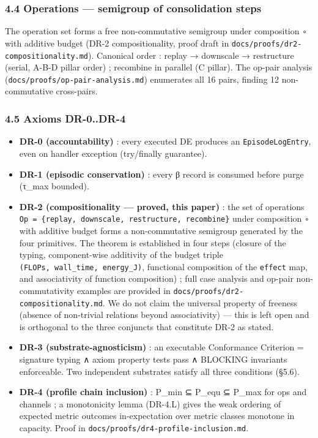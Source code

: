 \documentclass[
]{article}
\providecommand{\tightlist}{%
  \setlength{\itemsep}{0pt}\setlength{\parskip}{0pt}}
\begin{document}
\subsubsection{4.4 Operations --- semigroup of consolidation
steps}\label{operations-semigroup-of-consolidation-steps}

The operation set forms a free non-commutative semigroup under
composition \texttt{∘} with additive budget (DR-2 compositionality,
proof draft in \texttt{docs/proofs/dr2-compositionality.md}). Canonical
order : replay → downscale → restructure (serial, A-B-D pillar order) ;
recombine in parallel (C pillar). The op-pair analysis
(\texttt{docs/proofs/op-pair-analysis.md}) enumerates all 16 pairs,
finding 12 non-commutative cross-pairs.

\subsubsection{4.5 Axioms DR-0..DR-4}\label{axioms-dr-0..dr-4}

\begin{itemize}
\tightlist
\item
  \textbf{DR-0 (accountability)} : every executed DE produces an
  \texttt{EpisodeLogEntry}, even on handler exception (try/finally
  guarantee).
\item
  \textbf{DR-1 (episodic conservation)} : every β record is consumed
  before purge (τ\_max bounded).
\item
  \textbf{DR-2 (compositionality --- proved, this paper)} : the set of
  operations
  \texttt{Op\ =\ \{replay,\ downscale,\ restructure,\ recombine\}} under
  composition \texttt{∘} with additive budget forms a non-commutative
  semigroup generated by the four primitives. The theorem is established
  in four steps (closure of the typing, component-wise additivity of the
  budget triple \texttt{(FLOPs,\ wall\_time,\ energy\_J)}, functional
  composition of the \texttt{effect} map, and associativity of function
  composition) ; full case analysis and op-pair non-commutativity
  examples are provided in \texttt{docs/proofs/dr2-compositionality.md}.
  We do not claim the universal property of freeness (absence of
  non-trivial relations beyond associativity) --- this is left open and
  is orthogonal to the three conjuncts that constitute DR-2 as stated.
\item
  \textbf{DR-3 (substrate-agnosticism)} : an executable Conformance
  Criterion = signature typing ∧ axiom property tests pass ∧ BLOCKING
  invariants enforceable. Two independent substrates satisfy all three
  conditions (§5.6).
\item
  \textbf{DR-4 (profile chain inclusion)} : P\_min ⊆ P\_equ ⊆ P\_max for
  ops and channels ; a monotonicity lemma (DR-4.L) gives the weak
  ordering of expected metric outcomes in-expectation over metric
  classes monotone in capacity. Proof in
  \texttt{docs/proofs/dr4-profile-inclusion.md}.
\end{itemize}
\end{document}

